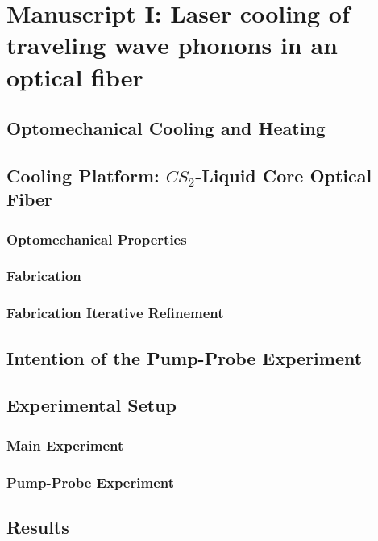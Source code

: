 \setcounter{rownumber}{0}
\singlespacing
\chapter{Manuscript I: Laser cooling of traveling wave phonons in an optical fiber}
\label{ch:Cooling}
\acresetall

\section{Optomechanical Cooling and Heating}

\section{Cooling Platform: \texorpdfstring{$CS_{2}$}{CS2}-Liquid Core Optical Fiber}

  \subsection{Optomechanical Properties}

  \subsection{Fabrication}

  \subsection{Fabrication Iterative Refinement}

\section{Intention of the Pump-Probe Experiment}

\section{Experimental Setup}

  \subsection{Main Experiment}

  \subsection{Pump-Probe Experiment}

\section{Results}

